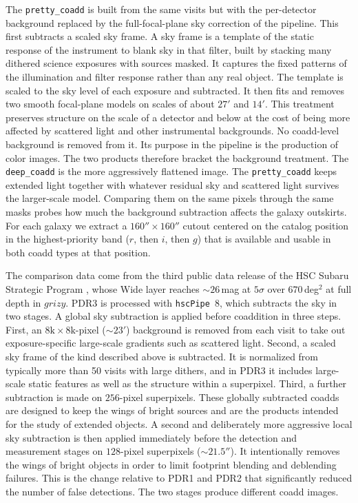 \documentclass[SE,lsstdraft,authoryear,toc]{lsstdoc}
\begin{document}
The \texttt{pretty\_coadd} is built from the same visits but with the per-detector background replaced by the full-focal-plane sky correction of the pipeline. This first subtracts a scaled sky frame. A sky frame is a template of the static response of the instrument to blank sky in that filter, built by stacking many dithered science exposures with sources masked. It captures the fixed patterns of the illumination and filter response rather than any real object. The template is scaled to the sky level of each exposure and subtracted. It then fits and removes two smooth focal-plane models on scales of about $27'$ and $14'$. This treatment preserves structure on the scale of a detector and below at the cost of being more affected by scattered light and other instrumental backgrounds. No coadd-level background is removed from it. Its purpose in the pipeline is the production of color images. The two products therefore bracket the background treatment. The \texttt{deep\_coadd} is the more aggressively flattened image. The \texttt{pretty\_coadd} keeps extended light together with whatever residual sky and scattered light survives the larger-scale model. Comparing them on the same pixels through the same masks probes how much the background subtraction affects the galaxy outskirts. For each galaxy we extract a $160'' \times 160''$ cutout centered on the catalog position in the highest-priority band ($r$, then $i$, then $g$) that is available and usable in both coadd types at that position.

The comparison data come from the third public data release of the HSC Subaru Strategic Program \citep[PDR3;][]{2022PASJ...74..247A}, whose Wide layer reaches $\sim 26$\,mag at $5\sigma$ over $670$\,deg$^2$ at full depth in $grizy$. PDR3 is processed with \texttt{hscPipe}~8, which subtracts the sky in two stages. A global sky subtraction is applied before coaddition in three steps. First, an $8\mathrm{k} \times 8\mathrm{k}$-pixel ($\sim 23'$) background is removed from each visit to take out exposure-specific large-scale gradients such as scattered light. Second, a scaled sky frame of the kind described above is subtracted. It is normalized from typically more than 50 visits with large dithers, and in PDR3 it includes large-scale static features as well as the structure within a superpixel. Third, a further subtraction is made on $256$-pixel superpixels. These globally subtracted coadds are designed to keep the wings of bright sources and are the products intended for the study of extended objects. A second and deliberately more aggressive local sky subtraction is then applied immediately before the detection and measurement stages on $128$-pixel superpixels ($\sim 21.5''$). It intentionally removes the wings of bright objects in order to limit footprint blending and deblending failures. This is the change relative to PDR1 and PDR2 that significantly reduced the number of false detections. The two stages produce different coadd images.
\end{document}
